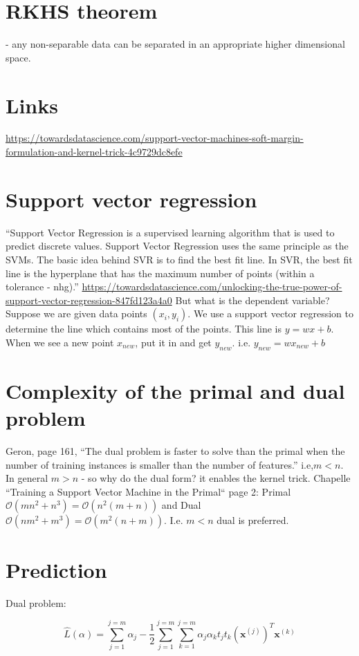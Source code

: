 \documentclass{article}
\newcommand{\beq}{\begin{equation}}
\newcommand{\eeq}{\end{equation}}
\begin{document}
\section{RKHS theorem}
- any non-separable data can be separated in an appropriate higher dimensional space.

\section{Links}
\url{https://towardsdatascience.com/support-vector-machines-soft-margin-formulation-and-kernel-trick-4c9729dc8efe}

\section{Support vector regression}
``Support Vector Regression is a supervised learning algorithm that is used to predict discrete values. Support Vector Regression uses the same principle as the SVMs. The basic idea behind SVR is to find the best fit line. In SVR, the best fit line is the hyperplane that has the maximum number of points (within a tolerance - nhg).'' \url{https://towardsdatascience.com/unlocking-the-true-power-of-support-vector-regression-847fd123a4a0} But what is the dependent variable? Suppose we are given data points $(x_i,y_i)$. We use a support vector regression to determine the line which contains most of the points. This line is $y=wx+b$. When we see a new point $x_{new}$, put it in and get $y_{new}$. i.e. $y_{new} = wx_{new}+b$

\section{Complexity of the primal and dual problem}
Geron, page 161, ``The dual problem is faster to solve than the primal when the number of training instances is smaller than the number of features.'' i.e,$m<n$. In general $m>n$ - so why do the dual form? it enables the kernel trick.
Chapelle ``Training a Support Vector Machine in the Primal`` page 2: Primal $\mathcal{O}(mn^2 + n^3)=\mathcal{O}(n^2(m+n))$ and Dual $\mathcal{O}(nm^2+m^3)=\mathcal{O}(m^2(n+m))$. I.e. $m<n$ dual is preferred.  


\section{Prediction}

Dual problem:

\beq
\hat{L}(\alpha) = \sum_{j=1}^{j=m}\alpha_j - \frac{1}{2}\sum_{j=1}^{j=m}\sum_{k=1}^{j=m}\alpha_j\alpha_kt_jt_k(\pmb{x}^{(j)})^T\pmb{x}^{(k)}
\eeq
\end{document}
